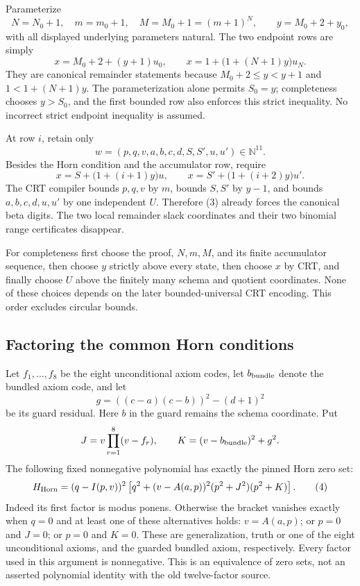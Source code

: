 Parameterize
\[
 N=N_0+1,\quad m=m_0+1,\quad M=M_0+1=(m+1)^N,
 \qquad y=M_0+2+y_0,
\]
with all displayed underlying parameters natural.  The two endpoint rows
are simply
\[
 x=M_0+2+(y+1)u_0,
 \qquad x=1+\bigl(1+(N+1)y\bigr)u_N. \tag{2}
\]
They are canonical remainder statements because $M_0+2\le y<y+1$ and
$1<1+(N+1)y$.  The parameterization alone permits $S_0=y$; completeness
chooses $y>S_0$, and the first bounded row also enforces this strict
inequality.  No incorrect strict endpoint inequality is assumed.

At row $i$, retain only
\[
 w=(p,q,v,a,b,c,d,S,S',u,u')\in\mathbb N^{11}.
\]
Besides the Horn condition and the accumulator row, require
\[
 x=S+\bigl(1+(i+1)y\bigr)u,
 \qquad x=S'+\bigl(1+(i+2)y\bigr)u'. \tag{3}
\]
The CRT compiler bounds $p,q,v$ by $m$, bounds $S,S'$ by $y-1$, and
bounds $a,b,c,d,u,u'$ by one independent $U$.  Therefore (3) already
forces the canonical beta digits.  The two local remainder slack
coordinates and their two binomial range certificates disappear.

For completeness first choose the proof, $N,m,M$, and its finite
accumulator sequence, then choose $y$ strictly above every state, then
choose $x$ by CRT, and finally choose $U$ above the finitely many schema
and quotient coordinates.  None of these choices depends on the later
bounded-universal CRT encoding.  This order excludes circular bounds.

\subsection{Factoring the common Horn conditions}

Let $f_1,\ldots,f_8$ be the eight unconditional axiom codes, let $b_{\rm bundle}$ denote
the bundled axiom code, and let
\[
 g=((c-a)(c-b))^2-(d+1)^2
\]
be its guard residual.  Here $b$ in the guard remains the schema coordinate.
Put
\[
 J=v\prod_{r=1}^{8}(v-f_r),\qquad
 K=(v-b_{\rm bundle})^2+g^2.
\]
The following fixed nonnegative polynomial has exactly the pinned Horn
zero set:
\[
 H_{\rm Horn}=(q-I(p,v))^2
 \left[q^2+(v-A(a,p))^2(p^2+J^2)(p^2+K)\right]. \tag{4}
\]
Indeed its first factor is modus ponens.  Otherwise the bracket vanishes
exactly when $q=0$ and at least one of these alternatives holds:
$v=A(a,p)$; or $p=0$ and $J=0$; or $p=0$ and $K=0$.
These are generalization, truth or one of the eight unconditional axioms,
and the guarded bundled axiom, respectively.  Every factor used in this
argument is nonnegative.  This is an equivalence of zero sets, not an
asserted polynomial identity with the old twelve-factor source.

